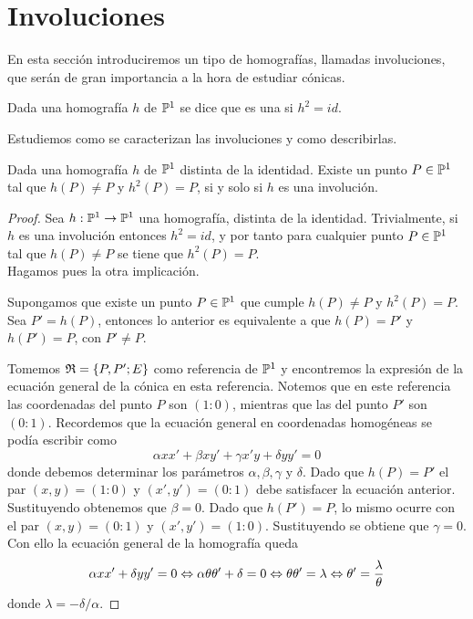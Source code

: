 \section{Involuciones}
En esta sección introduciremos un tipo de homografías, llamadas involuciones, que serán de gran importancia a la hora de estudiar cónicas.
\begin{defi}
	Dada una homografía $h$ de $\mathbb{P}^1$ se dice que es una  si $h^2=id$.
\end{defi}
Estudiemos como se caracterizan las involuciones y como describirlas.
\begin{lem}
	Dada una homografía $h$ de $\mathbb{P}^1$ distinta de la identidad. Existe un punto $P\in\mathbb{P}^1$ tal que $h(P)\not=P$ y $h^2(P)=P$, si y solo si $h$ es una involución.
\end{lem}
\begin{proof}
	Sea $h:\mathbb{P}^1\rightarrow\mathbb{P}^1$ una homografía, distinta de la identidad. Trivialmente, si $h$ es una involución entonces $h^2=id$, y por tanto para cualquier punto $P\in\mathbb{P}^1$ tal que $h(P)\not=P$ se tiene que $h^2(P)=P$.\\
	
	Hagamos pues la otra implicación.
	
	Supongamos que existe un punto $P\in\mathbb{P}^1$ que cumple $h(P)\not=P$ y $h^2(P)=P$. Sea $P'=h(P)$, entonces lo anterior es equivalente a que $h(P)=P'$ y $h(P')=P$, con $P'\not=P$.
	
	Tomemos $\mathfrak{R}=\{P,P';E\}$ como referencia de $\mathbb{P}^1$ y encontremos la expresión de la ecuación general de la cónica en esta referencia. Notemos que en este referencia las coordenadas del punto $P$ son $(1:0)$, mientras que las del punto $P'$ son $(0:1)$. Recordemos que la ecuación general en coordenadas homogéneas se podía escribir como
	\begin{equation*}
		\alpha xx'+\beta xy'+\gamma x'y+\delta yy'=0
	\end{equation*}
	donde debemos determinar los parámetros $\alpha,\beta,\gamma$ y $\delta$. Dado que $h(P)=P'$ el par $(x,y)=(1:0)$ y $(x',y')=(0:1)$ debe satisfacer la ecuación anterior. Sustituyendo obtenemos que $\beta=0$. Dado que $h(P')=P$, lo mismo ocurre con el par $(x,y)=(0:1)$ y $(x',y')=(1:0)$. Sustituyendo se obtiene que $\gamma=0$. Con ello la ecuación general de la homografía queda
	\begin{equation*}
		\alpha xx'+\delta yy'=0\Leftrightarrow \alpha\theta\theta'+\delta=0\Leftrightarrow \theta\theta'=\lambda\Leftrightarrow \theta'=\frac{\lambda}{\theta}
	\end{equation*}
	donde $\lambda=-\delta/\alpha$. 
	

\end{proof}
